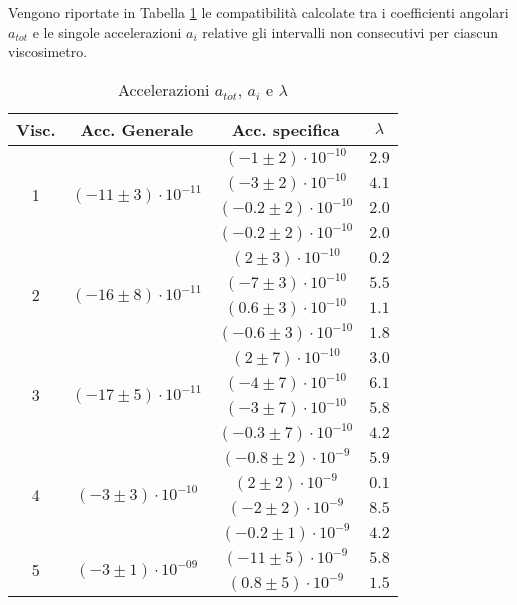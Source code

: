 \documentclass[a4paper,11pt,oneside]{article}
\begin{document}
Vengono riportate in Tabella \ref{tab:comp_acc} le compatibilità calcolate tra i coefficienti angolari $a_{tot}$ e le singole  accelerazioni $a_{i}$ relative gli intervalli non consecutivi per ciascun viscosimetro.

\begin{table}[h!]
\footnotesize
\caption{Accelerazioni $a_{tot}$, $a_{i}$ e $\lambda$}
\label{tab:comp_acc}
    \centering
    \begin{tabular}{|c|c|c|c|}
        \hline
        \textbf{Visc.} & \textbf{Acc. Generale} & \textbf{Acc. specifica} & \textbf{$\lambda$} \\ \hline
        \multirow{4}{*}{1}& \multirow{4}{*}{$(-11 \pm 3)\cdot10^{-11}$}& $(-1 \pm 2)\cdot10^{-10}$ & $2.9$ \\
        & & $(-3 \pm 2)\cdot10^{-10}$ & $4.1$ \\
        & & $(-0.2 \pm 2)\cdot10^{-10}$ & $2.0$ \\
        & & $(-0.2 \pm 2)\cdot10^{-10}$ & $2.0$ \\
        \hline
        \multirow{4}{*}{2}& \multirow{4}{*}{$(-16 \pm 8)\cdot10^{-11}$}& $(2 \pm 3)\cdot10^{-10}$ & $0.2$ \\
        & & $(-7 \pm 3)\cdot10^{-10}$ & $5.5$ \\
        & & $(0.6 \pm 3)\cdot10^{-10}$ & $1.1$ \\
        & & $(-0.6 \pm 3)\cdot10^{-10}$ & $1.8$ \\
        \hline
        \multirow{4}{*}{3}& \multirow{4}{*}{$(-17 \pm 5)\cdot10^{-11}$}& $(2 \pm 7)\cdot10^{-10}$ & $3.0$ \\
        & & $(-4 \pm 7)\cdot10^{-10}$ & $6.1$ \\
        & & $(-3 \pm 7)\cdot10^{-10}$ & $5.8$ \\
        & & $(-0.3 \pm 7)\cdot10^{-10}$ & $4.2$ \\
        \hline
        \multirow{4}{*}{4}& \multirow{4}{*}{$(-3 \pm 3)\cdot10^{-10}$}& $(-0.8 \pm 2)\cdot10^{-9}$ & $5.9$ \\
        & & $(2 \pm 2)\cdot10^{-9}$ & $0.1$ \\
        & & $(-2 \pm 2)\cdot10^{-9}$ & $8.5$ \\
        & & $(-0.2 \pm 1)\cdot10^{-9}$ & $4.2$ \\
        \hline
        \multirow{4}{*}{5}& \multirow{4}{*}{$(-3 \pm 1)\cdot10^{-09}$}& $(-11 \pm 5)\cdot10^{-9}$ & $5.8$ \\
        & & $(0.8 \pm 5)\cdot10^{-9}$ & $1.5$ \\

\end{tabular}
\end{table}
\end{document}

